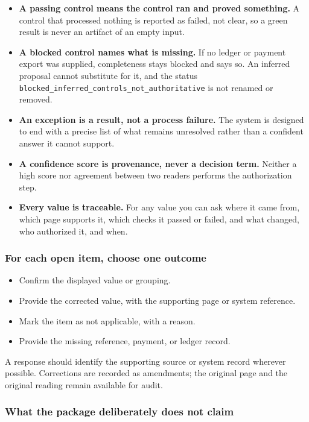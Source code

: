 \documentclass[
]{article}
\providecommand{\tightlist}{%
  \setlength{\itemsep}{0pt}\setlength{\parskip}{0pt}}
\begin{document}
\begin{itemize}
\tightlist
\item
  \textbf{A passing control means the control ran and proved something.}
  A control that processed nothing is reported as failed, not clear, so
  a green result is never an artifact of an empty input.
\item
  \textbf{A blocked control names what is missing.} If no ledger or
  payment export was supplied, completeness stays blocked and says so.
  An inferred proposal cannot substitute for it, and the status
  \texttt{blocked\_\allowbreak{}inferred\_\allowbreak{}controls\_\allowbreak{}not\_\allowbreak{}authoritative}
  is not renamed or removed.
\item
  \textbf{An exception is a result, not a process failure.} The system
  is designed to end with a precise list of what remains unresolved
  rather than a confident answer it cannot support.
\item
  \textbf{A confidence score is provenance, never a decision term.}
  Neither a high score nor agreement between two readers performs the
  authorization step.
\item
  \textbf{Every value is traceable.} For any value you can ask where it
  came from, which page supports it, which checks it passed or failed,
  and what changed, who authorized it, and when.
\end{itemize}

\subsubsection{For each open item, choose one
outcome}\label{for-each-open-item-choose-one-outcome}

\begin{itemize}
\tightlist
\item
  Confirm the displayed value or grouping.
\item
  Provide the corrected value, with the supporting page or system
  reference.
\item
  Mark the item as not applicable, with a reason.
\item
  Provide the missing reference, payment, or ledger record.
\end{itemize}

A response should identify the supporting source or system record
wherever possible. Corrections are recorded as amendments; the original
page and the original reading remain available for audit.

\subsubsection{What the package deliberately does not
claim}\label{what-the-package-deliberately-does-not-claim}
\end{document}
